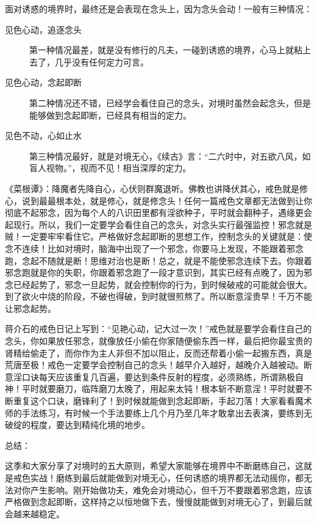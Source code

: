 \documentclass{ctexart}
\begin{document}
面对诱惑的境界时，最终还是会表现在念头上，因为念头会动！一般有三种情况：

\begin{description}
    \item[见色心动，追逐念头] 第一种情况最差，就是没有修行的凡夫，一碰到诱惑的境界，心马上就粘上去了，几乎没有任何定力可言。
    \item[见色心动，念起即断] 第二种情况还不错，已经学会看住自己的念头，对境时虽然会起念头，但是能够做到念起即断，已经具有相当的定力。
    \item[见色不动，心如止水] 第三种情况最好，就是对境无心，《续古》言：“二六时中，对五欲八风，如盲人视物。”，视而不见！相当深厚的定力。
\end{description}

《菜根谭》：降魔者先降自心，心伏则群魔退听。佛教也讲降伏其心，戒色就是修心，说到最最根本处，就是修心，就是修念头！任何一篇戒色文章都无法做到让你彻底不起邪念，因为每个人的八识田里都有淫欲种子，平时就会翻种子，遇缘更会起现行。所以，我们一定要学会看住自己的念头，对念头实行最强监控！邪念就是贼！一定要牢牢看住它。严格做好念起即断的思想工作，控制念头的关键就是：使念不连续！比如对境时，脑海中出现了一个邪念，你要马上发现，不能跟着邪念跑，念起不随就是断！思维对治也是断！总之，就是不能使邪念连续下去。你跟着邪念跑就是你的失职，你跟着邪念跑了一段才意识到，其实已经有点晚了，因为邪念已经起势了，邪念一旦起势，就会控制你的行为，到时候破戒的可能就会很大。到了欲火中烧的阶段，不破也得破，到时就很煎熬了。所以断意淫贵早！千万不能让邪念起势。

蒋介石的戒色日记上写到：“见艳心动，记大过一次！”戒色就是要学会看住自己的念头，你如果放任邪念，就像放任小偷在你家随便偷东西一样，最后把你最宝贵的肾精给偷走了，而你作为主人非但不加以阻止，反而还帮着小偷一起搬东西，真是荒唐至极！戒色一定要学会控制自己的念头！越早介入越好，越晚介入越被动。断意淫口诀每天应该重复几百遍，要达到条件反射的程度，必须熟练，所谓熟极自神！平时就要磨刀，临阵磨刀太晚了，用起来太钝！根本斩不断意淫！平时就要不断重复这个口诀，磨锋利了！到时候就能做到念起即断，手起刀落！大家看看魔术师的手法练习，有时候一个手法要练上几个月乃至几年才敢拿出去表演，要练到无破绽的程度，要达到精纯化境的地步。

总结：

这季和大家分享了对境时的五大原则，希望大家能够在境界中不断磨练自己，这就是戒色实战！磨练到最后就能做到对境无心，任何诱惑的境界都无法动摇你，都无法对你产生影响。刚开始做功夫，难免会对境动心，但千万不要跟着邪念跑，应该严格做到念起即断，这样持之以恒地做下去，慢慢就能做到对境无心了，到最后就会越来越稳定。
\end{document}
